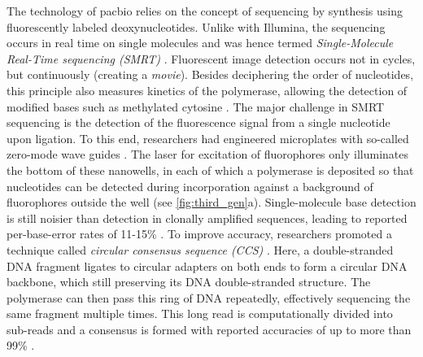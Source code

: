 
The technology of \acl{pacbio} relies on the concept of sequencing by synthesis using
fluorescently labeled deoxynucleotides. Unlike with Illumina, the sequencing
occurs in real time on single molecules and was hence termed
\emph{Single-Molecule Real-Time sequencing (SMRT)} \citep{Eid2009}. Fluorescent
image detection occurs not in cycles, but continuously (creating a \emph{movie}).
Besides deciphering the order of nucleotides, this principle also measures
kinetics of the polymerase, allowing the detection of modified bases such as
methylated cytosine \citep{Flusberg2010}. The major challenge in SMRT sequencing
is the detection of the fluorescence signal from a single nucleotide upon
ligation. To this end, researchers had engineered microplates with so-called
zero-mode wave guides \citep{Uemura2010}. The laser for excitation of
fluorophores only illuminates the bottom of these nanowells, in each of which a
polymerase is deposited so that nucleotides can be detected during incorporation
against a background of fluorophores outside the well \citep{Heather2016} (see
\cref{fig:third_gen}a). Single-molecule base detection is still noisier than
detection in clonally amplified sequences, leading to reported per-base-error
rates of 11-15\% \citep{Rhoads2015}. To improve accuracy, \pacbio researchers
promoted a technique called \emph{circular consensus sequence (CCS)}
\citep{Travers2010}. Here, a double-stranded DNA fragment ligates to circular
adapters on both ends to form a circular DNA backbone, which still preserving
its DNA double-stranded structure. The polymerase can then pass this ring of DNA
repeatedly, effectively sequencing the same fragment multiple times. This long
read is computationally divided into sub-reads and a consensus is formed with
reported accuracies of up to more than 99\% \citep{Rhoads2015}.

